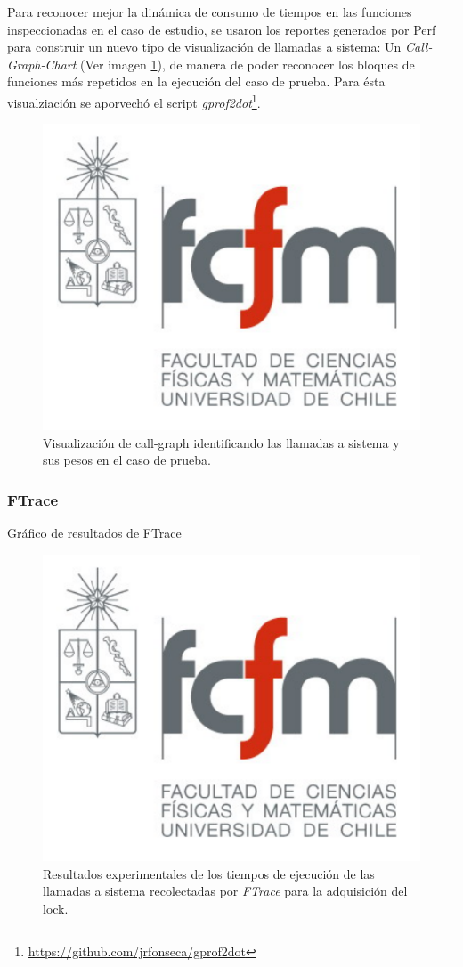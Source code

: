 Para reconocer mejor la dinámica de consumo de tiempos en las funciones inspeccionadas en el caso de estudio, se usaron los reportes generados por Perf para construir un nuevo tipo de visualización de llamadas a sistema: Un \emph{Call-Graph-Chart} (Ver imagen \ref{fig:rescallGraph}), de manera de poder reconocer los bloques de funciones más repetidos en la ejecución del caso de prueba. Para ésta visualziación se aporvechó el script \emph{gprof2dot}\footnote{\url{https://github.com/jrfonseca/gprof2dot}}.
\begin{figure}[!h]
	\centering
	\includegraphics[scale=.5]{imagenes/fcfm}
	\caption{Visualización de call-graph identificando las llamadas a sistema y sus pesos en el caso de prueba.}
	\label{fig:rescallGraph}
\end{figure}

\subsubsection{FTrace}
Gráfico de resultados de FTrace
\begin{figure}[!h]
	\centering
	\includegraphics[scale=.5]{imagenes/fcfm}
	\caption{Resultados experimentales de los tiempos de ejecución de las llamadas a sistema recolectadas por \emph{FTrace} para la adquisición del lock.}
	\label{fig:resFtrace}
\end{figure}

